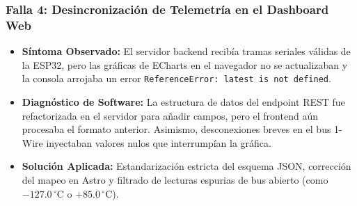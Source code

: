 \subsubsection{Falla 4: Desincronización de Telemetría en el Dashboard Web}
\begin{itemize}
    \item \textbf{Síntoma Observado:} El servidor backend recibía tramas seriales válidas de la ESP32, pero las gráficas de ECharts en el navegador no se actualizaban y la consola arrojaba un error \texttt{ReferenceError: latest is not defined}.
    \item \textbf{Diagnóstico de Software:} La estructura de datos del endpoint REST fue refactorizada en el servidor para añadir campos, pero el frontend aún procesaba el formato anterior. Asimismo, desconexiones breves en el bus 1-Wire inyectaban valores nulos que interrumpían la gráfica.
    \item \textbf{Solución Aplicada:} Estandarización estricta del esquema JSON, corrección del mapeo en Astro y filtrado de lecturas espurias de bus abierto (como $-127.0\,^\circ\text{C}$ o $+85.0\,^\circ\text{C}$).
\end{itemize}
